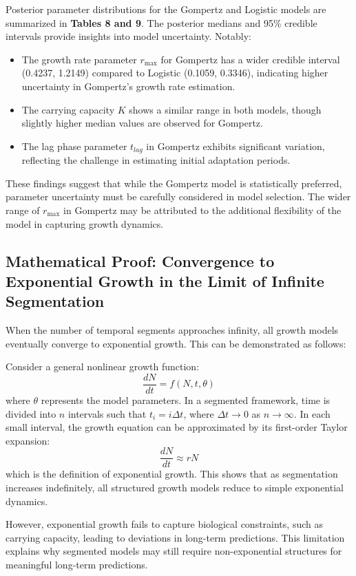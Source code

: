 \documentclass{article}
\begin{document}
Posterior parameter distributions for the Gompertz and Logistic models are summarized in \textbf{Tables 8 and 9}. The posterior medians and 95\% credible intervals provide insights into model uncertainty. Notably:
\begin{itemize}
    \item The growth rate parameter $r_{\max}$ for Gompertz has a wider credible interval (0.4237, 1.2149) compared to Logistic (0.1059, 0.3346), indicating higher uncertainty in Gompertz's growth rate estimation.
    \item The carrying capacity $K$ shows a similar range in both models, though slightly higher median values are observed for Gompertz.
    \item The lag phase parameter $t_{lag}$ in Gompertz exhibits significant variation, reflecting the challenge in estimating initial adaptation periods.
\end{itemize}
These findings suggest that while the Gompertz model is statistically preferred, parameter uncertainty must be carefully considered in model selection. The wider range of $r_{\max}$ in Gompertz may be attributed to the additional flexibility of the model in capturing growth dynamics.

\subsection{Mathematical Proof: Convergence to Exponential Growth in the Limit of Infinite Segmentation}
When the number of temporal segments approaches infinity, all growth models eventually converge to exponential growth. This can be demonstrated as follows:

Consider a general nonlinear growth function:
\begin{equation}
    \frac{dN}{dt} = f(N, t, \theta)
\end{equation}
where $\theta$ represents the model parameters. In a segmented framework, time is divided into $n$ intervals such that $t_i = i \Delta t$, where $\Delta t \to 0$ as $n \to \infty$. In each small interval, the growth equation can be approximated by its first-order Taylor expansion:
\begin{equation}
    \frac{dN}{dt} \approx r N
\end{equation}
which is the definition of exponential growth. This shows that as segmentation increases indefinitely, all structured growth models reduce to simple exponential dynamics. 

However, exponential growth fails to capture biological constraints, such as carrying capacity, leading to deviations in long-term predictions. This limitation explains why segmented models may still require non-exponential structures for meaningful long-term predictions.
\end{document}

